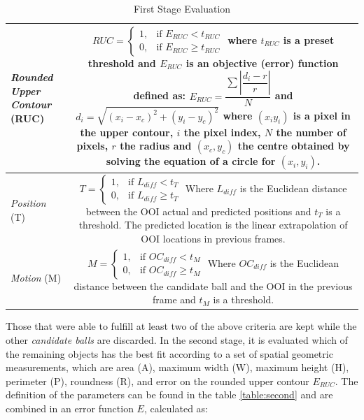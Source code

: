 \documentclass[a4paper]{article}
\begin{document}
\begin{table}[!ht]
\begin{tabularx}{\textwidth}{|s|C|}
\hline
	\textit{Rounded Upper Contour} (RUC) & 
	$ RUC= \begin{cases}
      1, &\text{if } E_{RUC} < t_{RUC} \\
      0, & \text{if } E_{RUC} \geq t_{RUC}
    \end{cases} $ 
    where $t_{RUC}$ is a preset threshold and $E_{RUC}$ is an objective (error) function defined as: 
$ E_{RUC} = \dfrac{\sum{|\dfrac{d_{i}-r}{r}|}}{N} $ and $d_{i} = \sqrt{(x_{i} - x_{c})^2 + (y_{i} - y_{c})^2} $ where $(x_{i}y_{i})$ is a pixel in the upper contour, $i$ the pixel index, $N$ the number of pixels, $r$ the radius and $(x_{c},y_{c})$ the centre obtained by solving the equation of a circle for $(x_{i},y_{i})$.  \\ \hline
	\textit{Position} (T) & 
	$ T= \begin{cases}
      1, &\text{if } L_{diff} < t_{T} \\
      0, & \text{if } L_{diff} \geq t_{T}
    \end{cases} $ 
    Where $L_{diff}$ is the Euclidean distance between the OOI actual and predicted positions and  $t_{T}$ is a threshold. The predicted location is the linear extrapolation of OOI locations in previous frames. \\ \hline
    \textit{Motion} (M) & 
	$ M= \begin{cases}
      1, &\text{if } OC_{diff} < t_{M} \\
      0, & \text{if } OC_{diff} \geq t_{M}
    \end{cases} $ 
    Where $OC_{diff}$ is the Euclidean distance between the candidate ball and the OOI in the previous frame and  $t_{M}$ is a threshold. \\ \hline
\end{tabularx}
\caption{First Stage Evaluation}
\label{table:first}
\end{table}

Those that were able to fulfill at least two of the above criteria are kept while the other \textit{candidate balls} are discarded. In the second stage, it is evaluated which of the remaining objects has the best fit according to a set of spatial geometric measurements, which are area (A), maximum width (W), maximum height (H), perimeter (P), roundness (R), and error on the rounded upper contour $E_{RUC}$. The definition of the parameters can be found in the table \ref{table:second} and are combined in an error function $E$, calculated as:
\end{document}
